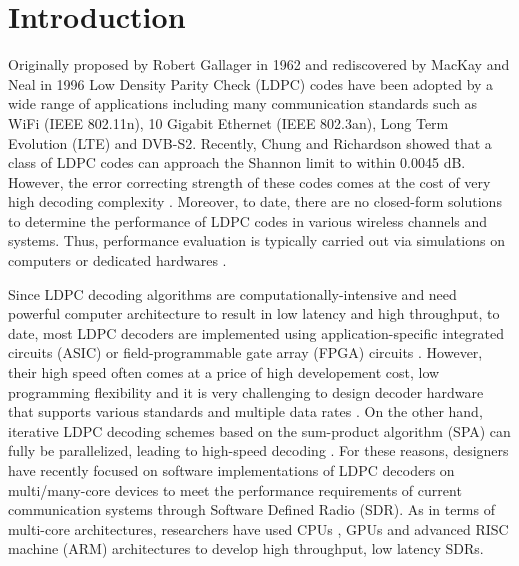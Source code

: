 \documentclass[conference]{IEEEtran}
\begin{document}
\section{Introduction}
Originally proposed by Robert Gallager in 1962 \cite{art_gallager} and rediscovered by MacKay and Neal in 1996 \cite{art_macKay} Low Density Parity Check (LDPC) codes have been adopted by a wide range of applications including many communication standards such as WiFi (IEEE 802.11n), 10 Gigabit Ethernet (IEEE 802.3an), Long Term Evolution (LTE) and DVB-S2. Recently, Chung and Richardson \cite{art_shannon} showed that a class of LDPC codes can approach the Shannon limit to within 0.0045 dB. However, the error correcting strength of these codes comes at the cost of very high decoding complexity \cite{art_ldpc_cpu1}. Moreover, to date, there are no closed-form solutions to determine the performance of LDPC codes in various wireless channels and systems. Thus, performance evaluation is typically carried out via simulations on computers or dedicated hardwares \cite{art_memory_coalesced}.

Since LDPC decoding algorithms are computationally-intensive and need powerful computer architecture to result in low latency and high throughput, to date, most LDPC decoders are implemented using application-specific integrated circuits (ASIC) or field-programmable gate array (FPGA) circuits \cite{art_ldpc_OpenCl_1}. However, their high speed often comes at a price of high developement cost, low programming flexibility \cite{art_convolutional} and it is very challenging to design decoder hardware that supports various standards and multiple data rates \cite{art_cuda_openmp}. On the other hand, iterative LDPC decoding schemes based on the sum-product algorithm (SPA) can fully be parallelized, leading to high-speed decoding \cite{art_shannon}. For these reasons, designers have recently focused on software implementations of LDPC decoders on multi/many-core devices \cite{art_massively} to meet the performance requirements of current communication systems through Software Defined Radio (SDR). As in terms of multi-core architectures, researchers have used CPUs \cite{art_cpu_gpu, art_ldpc_cpu0}, GPUs \cite{art_memory_coalesced, art_massively, art_optimize_0} and advanced RISC machine (ARM) \cite{art_ldpc_cpu0, art_neon} architectures to develop high throughput, low latency SDRs. 
\end{document}
